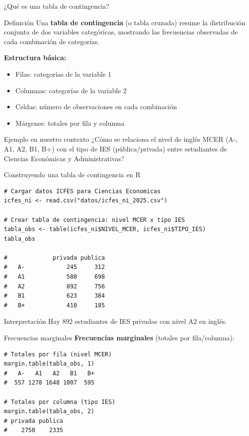 \documentclass[aspectratio=169, 11pt]{beamer}
\begin{document}
\begin{frame}{¿Qué es una tabla de contingencia?}
\begin{block}{Definición}
Una \textbf{tabla de contingencia} (o tabla cruzada) resume la distribución conjunta de dos variables categóricas, mostrando las frecuencias observadas de cada combinación de categorías.
\end{block}

\vspace{0.3cm}
\textbf{Estructura básica:}
\begin{itemize}
  \item Filas: categorías de la variable 1
  \item Columnas: categorías de la variable 2
  \item Celdas: número de observaciones en cada combinación
  \item Márgenes: totales por fila y columna
\end{itemize}

\vspace{0.3cm}
\begin{exampleblock}{Ejemplo en nuestro contexto}
¿Cómo se relaciona el nivel de inglés MCER (A-, A1, A2, B1, B+) con el tipo de IES (pública/privada) entre estudiantes de Ciencias Econ\'omicas y Administrativas?
\end{exampleblock}
\end{frame}

\begin{frame}[fragile]{Construyendo una tabla de contingencia en R}
\begin{lstlisting}
# Cargar datos ICFES para Ciencias Economicas
icfes_ni <- read.csv("datos/icfes_ni_2025.csv")

# Crear tabla de contingencia: nivel MCER x tipo IES
tabla_obs <- table(icfes_ni$NIVEL_MCER, icfes_ni$TIPO_IES)
tabla_obs

#             privada publica
#   A-            245     312
#   A1            580     698
#   A2            892     756
#   B1            623     384
#   B+            410     185
\end{lstlisting}

\begin{alertblock}{Interpretación}
Hay 892 estudiantes de IES privadas con nivel A2 en inglés.
\end{alertblock}
\end{frame}

\begin{frame}[fragile]{Frecuencias marginales}
\textbf{Frecuencias marginales} (totales por fila/columna):
\begin{lstlisting}
# Totales por fila (nivel MCER)
margin.table(tabla_obs, 1)
#   A-   A1   A2   B1   B+
#  557 1278 1648 1007  595

# Totales por columna (tipo IES)
margin.table(tabla_obs, 2)
# privada publica
#    2750    2335
\end{lstlisting}
\end{frame}
\end{document}
